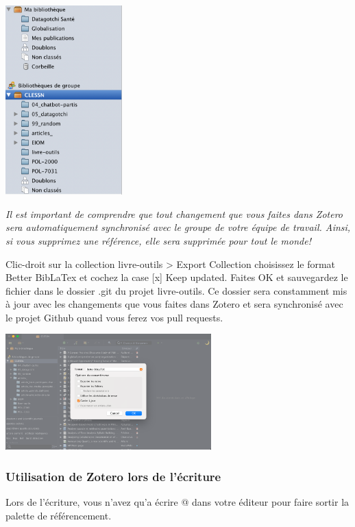 \documentclass[
  letterpaper,
]{scrbook}
\begin{document}
\includegraphics[width=1.77083in,height=\textheight]{images/chapitre6_zotero.png}

\emph{Il est important de comprendre que tout changement que vous faites
dans Zotero sera automatiquement synchronisé avec le groupe de votre
équipe de travail. Ainsi, si vous supprimez une référence, elle sera
supprimée pour tout le monde!}

Clic-droit sur la collection livre-outils \textgreater{} Export
Collection choisissez le format Better BibLaTex et cochez la case
{[}x{]} Keep updated. Faites OK et sauvegardez le fichier dans le
dossier .git du projet livre-outils. Ce dossier sera constamment mis à
jour avec les changements que vous faites dans Zotero et sera
synchronisé avec le projet Github quand vous ferez vos pull requests.

\includegraphics[width=3.125in,height=\textheight]{images/chapitre6_biblatex.png}

\hypertarget{utilisation-de-zotero-lors-de-luxe9criture}{%
\subsubsection{Utilisation de Zotero lors de
l'écriture}\label{utilisation-de-zotero-lors-de-luxe9criture}}

Lors de l'écriture, vous n'avez qu'a écrire @ dans votre éditeur pour
faire sortir la palette de référencement.
\end{document}
